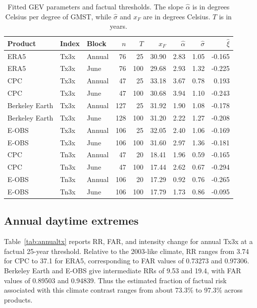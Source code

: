 \documentclass[11pt]{article}
\begin{document}
\begin{table}[htbp]
\centering\small
\caption{Fitted GEV parameters and factual thresholds. The slope $\widehat\alpha$ is in degrees Celsius per degree of GMST, while $\widehat\sigma$ and $x_F$ are in degrees Celsius. $T$ is in years.}
\label{tab:fits}
\setlength{\tabcolsep}{4pt}
\renewcommand{\arraystretch}{1.12}
\begin{tabular}{lllrrrrrr}\toprule
Product & Index & Block & $n$ & $T$ & $x_F$ & $\widehat\alpha$ & $\widehat\sigma$ & $\widehat\xi$\\\midrule
ERA5 & Tx3x & Annual & 76 & 25 & 30.90 & 2.83 & 1.05 & -0.165\\
ERA5 & Tx3x & June & 76 & 100 & 29.68 & 2.93 & 1.32 & -0.225\\
CPC & Tx3x & Annual & 47 & 25 & 33.18 & 3.67 & 0.78 & 0.193\\
CPC & Tx3x & June & 47 & 100 & 30.68 & 3.94 & 1.10 & -0.243\\
Berkeley Earth & Tx3x & Annual & 127 & 25 & 31.92 & 1.90 & 1.08 & -0.178\\
Berkeley Earth & Tx3x & June & 128 & 100 & 31.20 & 2.22 & 1.27 & -0.208\\
E-OBS & Tx3x & Annual & 106 & 25 & 32.05 & 2.40 & 1.06 & -0.169\\
E-OBS & Tx3x & June & 106 & 100 & 31.60 & 2.97 & 1.36 & -0.181\\
\midrule
CPC & Tn3x & Annual & 47 & 20 & 18.41 & 1.96 & 0.59 & -0.165\\
CPC & Tn3x & June & 47 & 100 & 17.44 & 2.62 & 0.67 & -0.294\\
E-OBS & Tn3x & Annual & 106 & 20 & 17.29 & 0.92 & 0.76 & -0.265\\
E-OBS & Tn3x & June & 106 & 100 & 17.79 & 1.73 & 0.86 & -0.095\\
\bottomrule\end{tabular}
\end{table}

\subsection{Annual daytime extremes}
Table~\ref{tab:annualtx} reports RR, FAR, and intensity change for annual
Tx3x at a factual 25-year threshold. Relative to the 2003-like climate,
RR ranges from 3.74 for CPC to 37.1 for ERA5, corresponding to FAR values
of 0.73273 and 0.97306. Berkeley Earth and E-OBS give intermediate RRs
of 9.53 and 19.4, with FAR values of 0.89503 and 0.94839. Thus the
estimated fraction of factual risk associated with this climate contrast
ranges from about 73.3\% to 97.3\% across products.
\end{document}
